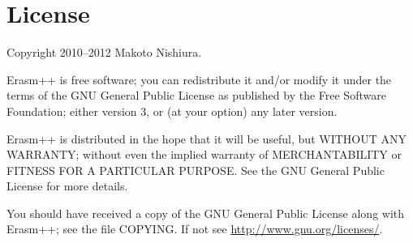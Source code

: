 \documentclass{article}
\begin{document}
\section{License}
Copyright 2010--2012 Makoto Nishiura.

Erasm++ is free software; you can redistribute it and/or modify it under
the terms of the GNU General Public License as published by the Free
Software Foundation; either version 3, or (at your option) any later
version.

Erasm++ is distributed in the hope that it will be useful, but WITHOUT ANY
WARRANTY; without even the implied warranty of MERCHANTABILITY or
FITNESS FOR A PARTICULAR PURPOSE.  See the GNU General Public License
for more details.

You should have received a copy of the GNU General Public License
along with Erasm++; see the file COPYING.  If not see
\url{http://www.gnu.org/licenses/}.



\end{document}
